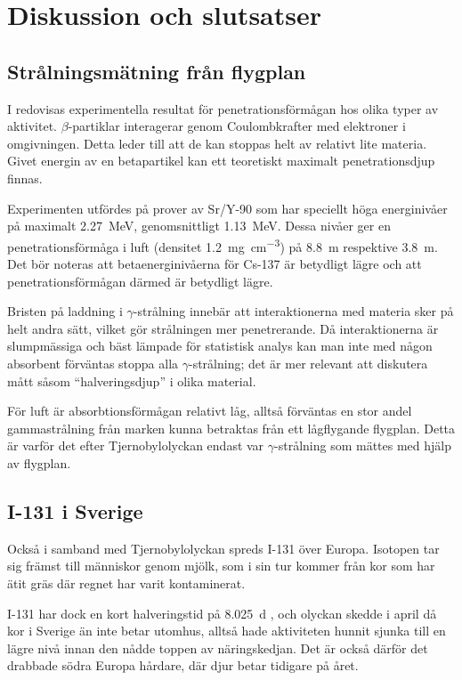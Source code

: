 \section{Diskussion och slutsatser}

\subsection{Strålningsmätning från flygplan}

I \cite{penetration} redovisas experimentella resultat för penetrationsförmågan
hos olika typer av aktivitet. $\beta$-partiklar interagerar genom
Coulombkrafter med elektroner i omgivningen. Detta leder till att de kan
stoppas helt av relativt lite materia. Givet energin av en betapartikel kan
ett teoretiskt maximalt penetrationsdjup finnas.

Experimenten utfördes på prover av Sr/Y-90 som har speciellt höga energinivåer
på maximalt \qty{2.27}{\MeV}, genomsnittligt \qty{1.13}{\MeV}. Dessa nivåer ger
en penetrationsförmåga i luft (densitet \qty{1.2}{\mg\per\cm\cubed}) på
\qty{8.8}{\m} respektive \qty{3.8}{\m}. Det bör noteras att betaenerginivåerna
för Cs-137 är betydligt lägre \parencite{fysika} och att penetrationsförmågan
därmed är betydligt lägre.

Bristen på laddning i $\gamma$-strålning innebär att interaktionerna med
materia sker på helt andra sätt, vilket gör strålningen mer penetrerande. Då
interaktionerna är slumpmässiga och bäst lämpade för statistisk analys kan man
inte med någon absorbent förväntas stoppa alla $\gamma$-strålning; det är mer
relevant att diskutera mått såsom ``halveringsdjup'' i olika material.

För luft är absorbtionsförmågan relativt låg, alltså förväntas en stor andel
gammastrålning från marken kunna betraktas från ett lågflygande flygplan. Detta
är varför det efter Tjernobylolyckan endast var $\gamma$-strålning som mättes
med hjälp av flygplan.

\subsection{I-131 i Sverige}

Också i samband med Tjernobylolyckan spreds I-131 över Europa. Isotopen tar sig
främst till människor genom mjölk, som i sin tur kommer från kor som har ätit
gräs där regnet har varit kontaminerat.

I-131 har dock en kort halveringstid på \qty{8.025}{\day} \parencite{fysika},
och olyckan skedde i april då kor i Sverige än inte betar utomhus, alltså hade
aktiviteten hunnit sjunka till en lägre nivå innan den nådde toppen av
näringskedjan. Det är också därför det drabbade södra Europa hårdare, där djur
betar tidigare på året.

